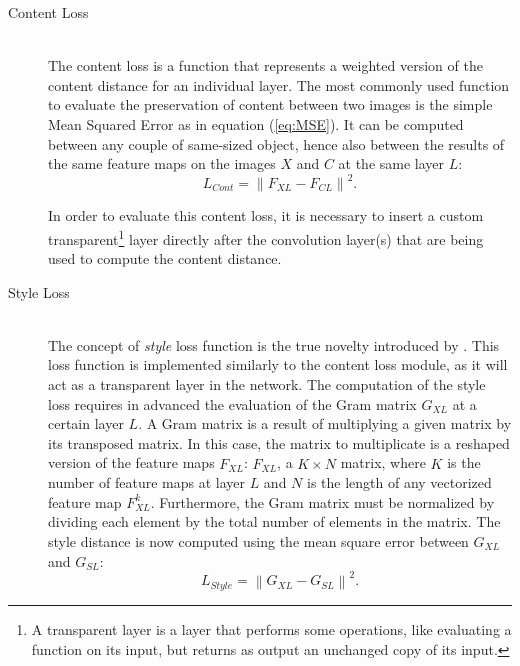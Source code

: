 \documentclass[12pt,a4paper]{report}
\newcommand{\norm}[1]{\left\lVert#1\right\rVert} %
\begin{document}
    \begin{description}
        \item [Content Loss] \hfill \\
        The content loss is a function that represents a weighted version of the content distance for an individual layer.
        The most commonly used function to evaluate the preservation of content between two images is the simple Mean Squared Error as in equation (\ref{eq:MSE}). It can be computed between any couple of same-sized object, hence also between the results of the same feature maps on the images $X$ and $C$ at the same layer $L$:
        \begin{equation}
            L_{Cont} = \norm{F_{XL}−F_{CL}}^2.
            \label{eq:cont_loss}
        \end{equation}

        In order to evaluate this content loss, it is necessary to insert a custom transparent\footnote{A transparent layer is a layer that performs some operations, like evaluating a function on its input, but returns as output an unchanged copy of its input.} layer directly after the convolution layer(s) that are being used to compute the content distance.

        \item [Style Loss] \hfill \\
        The concept of \textit{style} loss function is the true novelty introduced by \cite{1508.06576}. This loss function is implemented similarly to the content loss module, as it will act as a transparent layer in the network. The computation of the style loss requires in advanced the evaluation of the Gram matrix $G_{XL}$ at a certain layer $L$.
        A Gram matrix is a result of multiplying a given matrix by its transposed matrix. In this case, the matrix to multiplicate is a reshaped version of the feature maps $F_{XL}$: $\hat{F}_{XL}$, a $K \times N$ matrix, where $K$ is the number of feature maps at layer $L$ and $N$ is the length of any vectorized feature map $F^k_{XL}$.
        Furthermore, the Gram matrix must be normalized by dividing each element by the total number of elements in the matrix. The style distance is now computed using the mean square error between $G_{XL}$ and $G_{SL}$:
        \begin{equation}
            L_{Style} = \norm{G_{XL}−G_{SL}}^2.
            \label{eq:styl_loss}
        \end{equation}
    \end{description}
\end{document}
